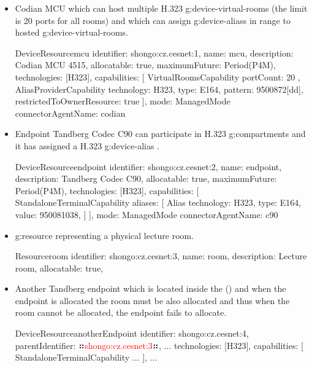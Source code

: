 \begin{itemize}

\item Codian MCU which can host multiple H.323 \glspl{g:device-virtual-room} (the limit is 20 ports for all rooms) and which can assign \glspl{g:device-alias} in range  to hosted \glspl{g:device-virtual-room}.

\begin{ObjectCode}{DeviceResource}{mcu}{}
identifier: shongo:cz.cesnet:1,
name: mcu,
description: Codian MCU 4515,
allocatable: true,
maximumFuture: Period(P4M),
technologies: [H323],
capabilities: [
  VirtualRoomsCapability {
    portCount: 20
  },
  AliasProviderCapability {
    technology: H323,
    type: E164,
    pattern: 9500872[dd],
    restrictedToOwnerResource: true 
  }
],
mode: ManagedMode{
  connectorAgentName: codian
}
\end{ObjectCode}

\item Endpoint Tandberg Codec C90 can participate in H.323 \glspl{g:compartment} and it has assigned a H.323 \gls{g:device-alias} . 

\begin{ObjectCode}{DeviceResource}{endpoint}{}
identifier: shongo:cz.cesnet:2,
name: endpoint,
description: Tandberg Codec C90,
allocatable: true,
maximumFuture: Period(P4M),
technologies: [H323],
capabilities: [
  StandaloneTerminalCapability {
    aliases: [
      Alias {
        technology: H323,
        type: E164,
        value: 950081038,
      }
    ]
  }
],
mode: ManagedMode{
  connectorAgentName: c90
}
\end{ObjectCode}

\item \Gls{g:resource} representing a physical lecture room.

\begin{ObjectCode}{Resource}{room}{}
identifier: shongo:cz.cesnet:3,
name: room,
description: Lecture room,
allocatable: true,
\end{ObjectCode}


\item Another Tandberg endpoint which is located inside the  () and when the endpoint is allocated the room must be also allocated and thus when the room cannot be allocated, the endpoint fails to allocate.

\begin{ObjectCode}{DeviceResource}{anotherEndpoint}{}
identifier: shongo:cz.cesnet:4,
parentIdentifier: ⠶\textcolor{red}{shongo:cz.cesnet:3}⠶,
...
technologies: [H323],
capabilities: [
  StandaloneTerminalCapability {
    ...
  }
],
...
\end{ObjectCode}


\end{itemize}
